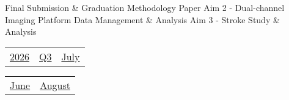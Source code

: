 \vfill{\centering{} \small{Final Submission \& Graduation}\hspace{ 1.5em } \small{Methodology Paper}\hspace{ 1.5em } \small{Aim 2 - Dual-channel Imaging Platform}\hspace{ 1.5em } \small{Data Management \& Analysis}\hspace{ 1.5em } \small{Aim 3 - Stroke Study \& Analysis}\hspace{ 1.5em }\par}

\pagebreak
{\noindent\Large\renewcommand{\arraystretch}{\myNumArrayStretch}\begin{tabular}{|l|l|l}
\hyperlink{2026}{2026} & \hyperlink{Q3}{Q3} & \hyperlink{July}{July}
\end{tabular}\hfill%
\begin{tabular}{r|r@{}}
\hyperlink{month-2026-6}{June} & \hyperlink{month-2026-8}{August}
\end{tabular}}
\myLineThick

